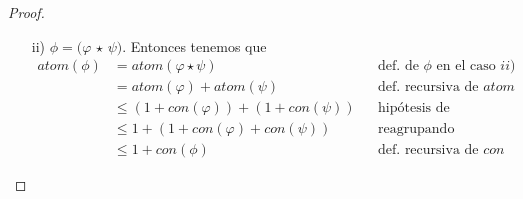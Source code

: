 \documentclass[letterpaper,12pt]{article}
\begin{document}
\begin{enumerate}
\begin{proof}
\begin{itemize}
            \item[ii)] $\phi = (\varphi$ $\star$ $\psi)$. Entonces tenemos que 
            \begin{align*}
                atom(\phi) &= atom(\varphi \star \psi) 
                           && \text{def. de $\phi$ en el caso $ii)$} \\ 
                           &= atom(\varphi) + atom(\psi)
                           && \text{def. recursiva de $atom$} \\
                           &\leq (1 + con(\varphi)) + (1 + con(\psi))
                           && \text{hipótesis de inducción} \\
                           &\leq 1 + (1 + con(\varphi) + con(\psi))
                           && \text{reagrupando} \\
                           &\leq 1 + con(\phi)
                           && \text{def. recursiva de $con$}
            \end{align*}

        \end{itemize} 
        
    \end{proof}

\end{enumerate}
\end{document}
